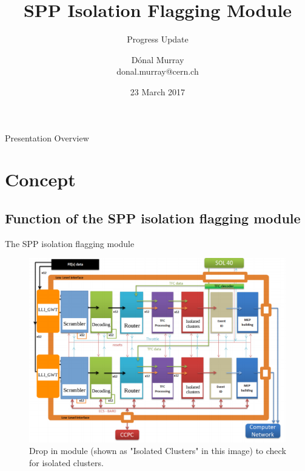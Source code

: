 \documentclass{beamer}
\title{SPP Isolation Flagging Module}
\subtitle{Progress Update}
\author[Dónal Murray\hspace*{80pt}donal.murray@cern.ch]{Dónal Murray \\
  \vskip7pt
  \tiny{donal.murray@cern.ch}
}
\institute{}
\date{23 March 2017}
\begin{document}
{
\begin{frame}
  \titlepage
\end{frame}
}
\addtocounter{framenumber}{-1} %

\begin{frame}{Presentation Overview}
  \tableofcontents
\end{frame}





\section{Concept}

\subsection{Function of the SPP isolation flagging module}

\begin{frame}{The SPP isolation flagging module}
  \begin{figure}
    \includegraphics[scale=0.3]{Overview}
    \caption{\centering Drop in module (shown as "Isolated Clusters" in this
    image) to check for isolated clusters.}
  \end{figure}
\end{frame}
\end{document}
